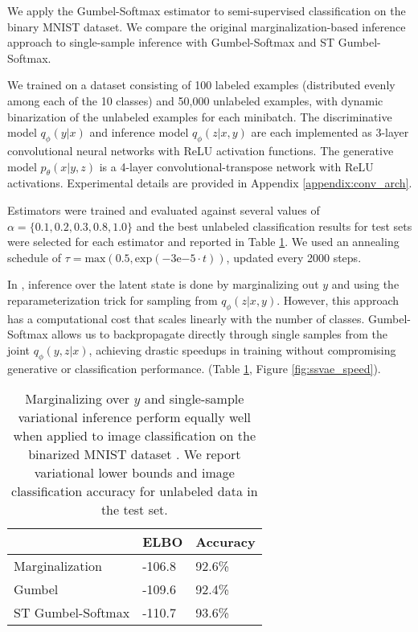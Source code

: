 \documentclass{article} %
\begin{document}
We apply the Gumbel-Softmax estimator to semi-supervised classification on the binary MNIST dataset. We compare the original marginalization-based inference approach \citep{kingma_ssvae} to single-sample inference with Gumbel-Softmax and ST Gumbel-Softmax. 

We trained on a dataset consisting of 100 labeled examples (distributed evenly among each of the 10 classes) and 50,000 unlabeled examples, with dynamic binarization of the unlabeled examples for each minibatch. The discriminative model $q_\phi(y|x)$ and inference model $q_\phi(z|x,y)$ are each implemented as 3-layer convolutional neural networks with ReLU activation functions. The generative model $p_\theta(x|y,z)$ is a 4-layer convolutional-transpose network with ReLU activations. Experimental details are provided in Appendix \ref{appendix:conv_arch}.

Estimators were trained and evaluated against several values of $\alpha = \{0.1,0.2,0.3,0.8,1.0\}$ and the best unlabeled classification results for test sets were selected for each estimator and reported in Table \ref{tab:ssvae_results_mnist}. We used an annealing schedule of $\tau = \text{max}(0.5, \text{exp}(-3\mathrm{e}{-5}\cdot t))$, updated every 2000 steps.

In \citet{kingma_ssvae}, inference over the latent state is done by marginalizing out $y$ and using the reparameterization trick for sampling from $q_\phi(z|x,y)$. However, this approach has a computational cost that scales linearly with the number of classes. Gumbel-Softmax allows us to backpropagate directly through single samples from the joint $q_\phi(y,z|x)$, achieving drastic speedups in training without compromising generative or classification performance. (Table \ref{tab:ssvae_results_mnist}, Figure \ref{fig:ssvae_speed}).



\begin{table}[ht]
\caption{Marginalizing over $y$ and single-sample variational inference perform equally well when applied to image classification on the binarized MNIST dataset \citep{larochelle2011}. We report variational lower bounds and image classification accuracy for unlabeled data in the test set.}
\label{tab:ssvae_results_mnist}
\begin{center}
\begin{tabular}{l|l|l}
					 & ELBO & Accuracy \\
   \hline
Marginalization        & -106.8 & 92.6\% \\
Gumbel                & -109.6 & 92.4\% \\
ST Gumbel-Softmax    & -110.7 & 93.6\%
\end{tabular}
\end{center}
\end{table}
\end{document}
